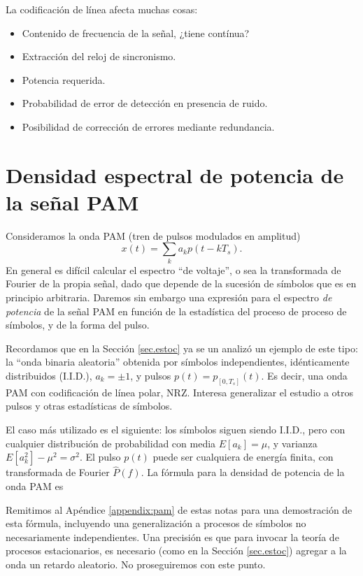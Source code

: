 La codificación de línea afecta muchas cosas:
\begin{itemize}
    \item Contenido de frecuencia de la señal, ¿tiene contínua?
    \item Extracción del reloj de sincronismo.
    \item Potencia requerida.
    \item Probabilidad de error de detección en presencia de ruido.
    \item Posibilidad de corrección de errores mediante redundancia.
\end{itemize}

\section{Densidad espectral de potencia de la señal PAM}\label{sec.densdig}

Consideramos la onda PAM (tren de pulsos modulados en amplitud)
\[
x(t) = \displaystyle\sum_k a_k p(t-kT_s).
\]
En general es difícil calcular el espectro ``de voltaje'', o sea
la transformada de Fourier de la propia señal, dado que depende de
la sucesión de símbolos que es en principio arbitraria.
Daremos sin embargo una expresión para el espectro \emph{de potencia}
de la señal PAM en función de la estadística del proceso de proceso de símbolos, y
de la forma del pulso.

Recordamos que en la Sección \ref{sec.estoc} ya se un analizó un ejemplo de este tipo: la ``onda binaria
aleatoria'' obtenida por símbolos independientes, idénticamente distribuidos (I.I.D.), $a_k=\pm 1$,
y pulsos $p(t)=p_{[0,T_s]}(t)$. Es decir, una onda PAM con codificación de línea polar,
NRZ. Interesa generalizar el estudio a otros pulsos y otras estadísticas de
símbolos.

El caso más utilizado es el siguiente: los símbolos siguen siendo I.I.D., pero con cualquier
distribución de probabilidad con media $E[a_k]=\mu$, y varianza $E[a_k^2]- \mu^2 = \sigma^2$.
El pulso $p(t)$ puede ser cualquiera de energía finita, con transformada de Fourier $\hat{P}(f)$.
 La fórmula para la densidad de potencia de la onda PAM es

\begin{center}
\end{center}

Remitimos al Apéndice \ref{appendix:pam} de estas notas para una demostración de esta fórmula, incluyendo una generalización a procesos de símbolos no necesariamente independientes. Una precisión es que para invocar la teoría de procesos estacionarios, es necesario (como en la Sección \ref{sec.estoc}) agregar a la onda un retardo aleatorio. No proseguiremos con este punto.

